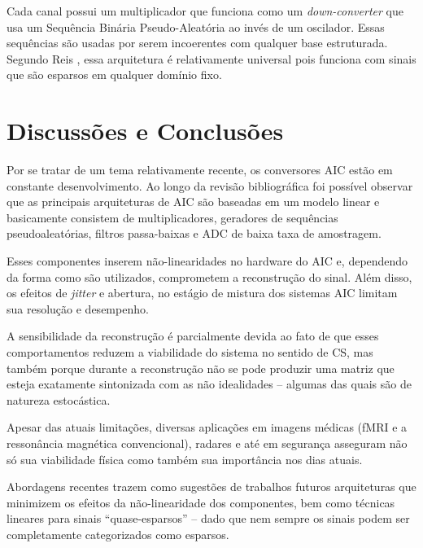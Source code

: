\documentclass[a4paper, 12pt]{article}
\begin{document}
Cada canal possui um multiplicador que funciona como um
\textit{down-converter} que usa um Sequência Binária Pseudo-Aleatória ao invés de um oscilador. Essas sequências são usadas por serem incoerentes com qualquer base estruturada. Segundo Reis \cite{Vanderson2017}, essa arquitetura é relativamente universal pois funciona com sinais que são esparsos em qualquer domínio fixo. 


\section{Discussões e Conclusões}

Por se tratar de um tema relativamente recente, os conversores AIC estão em constante desenvolvimento. Ao longo da revisão bibliográfica foi possível observar que as principais arquiteturas de AIC são baseadas em um modelo linear e basicamente consistem de multiplicadores, geradores de sequências pseudoaleatórias, filtros passa-baixas e ADC de baixa taxa de amostragem. 

Esses componentes inserem não-linearidades no hardware do AIC e, dependendo da forma como são utilizados, comprometem a reconstrução do sinal. Além disso, os efeitos de \textit{jitter} e abertura, no estágio de mistura dos sistemas AIC limitam sua resolução e desempenho.

A sensibilidade da reconstrução é parcialmente devida ao fato de que esses
comportamentos reduzem a viabilidade do sistema no sentido de CS, mas também porque durante a reconstrução não se pode produzir uma matriz que esteja exatamente sintonizada com as não idealidades -- algumas das quais são de natureza estocástica.

Apesar das atuais limitações, diversas aplicações em imagens médicas (fMRI e a ressonância magnética convencional), radares e até em segurança asseguram não só sua viabilidade física como também sua importância nos dias atuais.

Abordagens recentes trazem como sugestões de trabalhos futuros arquiteturas que minimizem os efeitos da não-linearidade dos componentes, bem como técnicas lineares para sinais ``quase-esparsos'' -- dado que nem sempre os sinais podem ser completamente categorizados como esparsos.

\clearpage
\printbibliography
\end{document}
